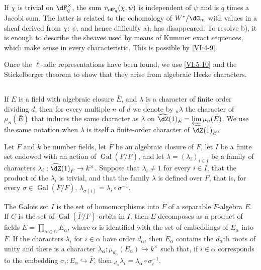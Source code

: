 \documentclass[12pt,oneside,english]{smfbook}
\DeclareMathOperator{\gal}{Gal}
\newcounter{char}
\begin{document}
If $\chi$ is trivial on $\dF_q^\times$, the sum $\tau_{\dF_q}(\chi,\psi)$ is independent of $\psi$ and is $q$ times a Jacobi sum. The latter is related to the cohomology of $W^\ast/\dG_m$ with values in a sheaf derived from $\chi$: $\psi$, and hence difficulty a), has disappeared. To resolve b), it is enough to describe the sheaves used by means of Kummer exact sequences, which make sense in every characteristic. This is possible by \ref{VI:4-9}.

Once the $\ell$-adic representations have been found, we use \ref{VI:5-10} and the Stickelberger theorem to show that they arise from algebraic Hecke characters.

\subsection{}\label{VI:6-1}

If $E$ is a field with algebraic closure $\bar E$, and $\lambda$ is a character of finite order dividing $d$, then for every multiple $n$ of $d$ we denote by ${}_n\lambda$ the character of $\mu_n(\bar E)$ that induces the same character as $\lambda$ on $\widehat\dZ(1)_{\bar E}=\varprojlim\mu_n(\bar E)$. We use the same notation when $\lambda$ is itself a finite-order character of $\widehat\dZ(1)_{\bar E}$.

Let $F$ and $k$ be number fields, let $\bar F$ be an algebraic closure of $F$, let $I$ be a finite set endowed with an action of $\gal(\bar F/F)$, and let $\lambda=(\lambda_i)_{i\in I}$ be a family of characters $\lambda_i:\widehat\dZ(1)_{\bar F}\to k^\times$. Suppose that $\lambda_i\ne1$ for every $i\in I$, that the product of the $\lambda_i$ is trivial, and that the family $\lambda$ is defined over $F$, that is, for every $\sigma\in\gal(\bar F/F)$, $\lambda_{\sigma(i)}=\lambda_i\circ\sigma^{-1}$.

The Galois set $I$ is the set of homomorphisms into $\bar F$ of a separable $F$-algebra $E$. If $C$ is the set of $\gal(\bar F/F)$-orbits in $I$, then $E$ decomposes as a product of fields $E=\prod_{\alpha\in C}E_\alpha$, where $\alpha$ is identified with the set of embeddings of $E_\alpha$ into $\bar F$. If the characters $\lambda_i$ for $i\in\alpha$ have order $d_\alpha$, then $E_\alpha$ contains the $d_\alpha$th roots of unity and there is a character $\lambda_\alpha:\mu_{d_\alpha}(E_\alpha)\hookrightarrow k^\times$ such that, if $i\in\alpha$ corresponds to the embedding $\sigma_i:E_\alpha\hookrightarrow\bar F$, then ${}_{d_\alpha}\lambda_i=\lambda_\alpha\circ\sigma_i^{-1}$.
\end{document}
